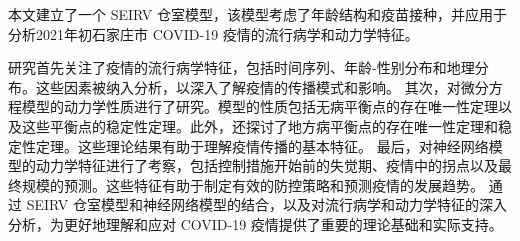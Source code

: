 \begin{innovation}

	本文建立了一个 SEIRV 仓室模型，该模型考虑了年龄结构和疫苗接种，并应用于分析2021年初石家庄市 COVID-19 疫情的流行病学和动力学特征。

	研究首先关注了疫情的流行病学特征，包括时间序列、年龄-性别分布和地理分布。这些因素被纳入分析，以深入了解疫情的传播模式和影响。
	其次，对微分方程模型的动力学性质进行了研究。模型的性质包括无病平衡点的存在唯一性定理以及这些平衡点的稳定性定理。此外，还探讨了地方病平衡点的存在唯一性定理和稳定性定理。这些理论结果有助于理解疫情传播的基本特征。
	最后，对神经网络模型的动力学特征进行了考察，包括控制措施开始前的失觉期、疫情中的拐点以及最终规模的预测。这些特征有助于制定有效的防控策略和预测疫情的发展趋势。
	通过 SEIRV 仓室模型和神经网络模型的结合，以及对流行病学和动力学特征的深入分析，为更好地理解和应对 COVID-19 疫情提供了重要的理论基础和实际支持。
\end{innovation}